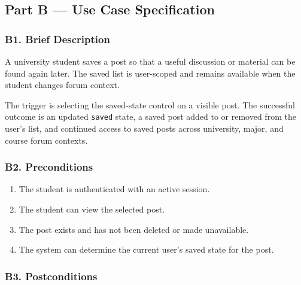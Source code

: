 \documentclass[12pt]{article}
\begin{document}
\subsection*{Part B --- Use Case Specification}
\par\medskip

\hypertarget{sec:b1-brief-description}{}
\subsubsection*{B1. Brief Description}
\par\medskip

A university student saves a post so that a useful discussion or material can be found again later. The saved list is user-scoped and remains available when the student changes forum context.
\par\medskip

The trigger is selecting the saved-state control on a visible post. The successful outcome is an updated \texttt{saved} state, a saved post added to or removed from the user's list, and continued access to saved posts across university, major, and course forum contexts.
\par\medskip

\hypertarget{sec:b2-preconditions}{}
\subsubsection*{B2. Preconditions}
\par\medskip

\begin{enumerate}
\item The student is authenticated with an active session.
\item The student can view the selected post.
\item The post exists and has not been deleted or made unavailable.
\item The system can determine the current user's saved state for the post.
\end{enumerate}
\par\medskip

\hypertarget{sec:b3-postconditions}{}
\subsubsection*{B3. Postconditions}
\par\medskip
\end{document}

